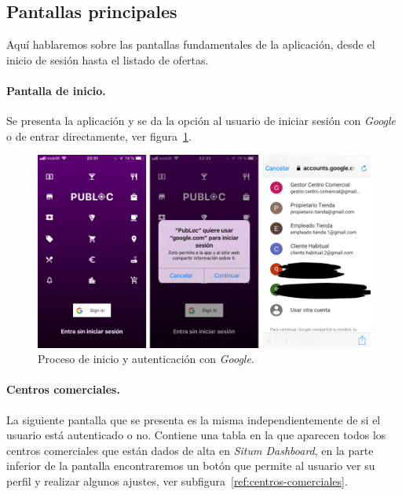\subsection{Pantallas principales}
Aquí hablaremos sobre las pantallas fundamentales de la aplicación, desde el inicio de sesión hasta el listado de ofertas.

\paragraph{Pantalla de inicio.} Se presenta la aplicación y se da la opción al usuario de iniciar sesión con \textit{Google} o de entrar directamente, ver figura~\ref{fig:inicio}.

\begin{figure}[tbp]
\centering
\includegraphics[scale=0.4]{figures/inicio.png}
\caption{Proceso de inicio y autenticación con \textit{Google}.\label{fig:inicio}}
\end{figure}

\paragraph{Centros comerciales.} La siguiente pantalla que se presenta es la misma independientemente de si el usuario está autenticado o no. Contiene una tabla en la que aparecen todos los centros comerciales que están dados de alta en \textit{Situm Dashboard}, en la parte inferior de la pantalla encontraremos un botón que permite al usuario ver su perfil y realizar algunos ajustes, ver subfigura~\ref{ref:centros-comerciales}.

